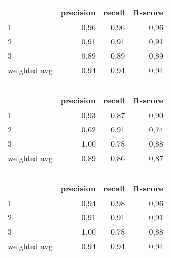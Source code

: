 \begin{table}
\centering
\caption{}%
\begin{tabular}{lrrr}
\toprule
{} &  precision &  recall &  f1-score \\
\midrule
1            &       0,96 &    0,96 &      0,96 \\
2            &       0,91 &    0,91 &      0,91 \\
3            &       0,89 &    0,89 &      0,89 \\
weighted avg &       0,94 &    0,94 &      0,94 \\
\bottomrule
\end{tabular}
\end{table}

\begin{table}
\centering
\caption{}%
\begin{tabular}{lrrr}
\toprule
{} &  precision &  recall &  f1-score \\
\midrule
1            &       0,93 &    0,87 &      0,90 \\
2            &       0,62 &    0,91 &      0,74 \\
3            &       1,00 &    0,78 &      0,88 \\
weighted avg &       0,89 &    0,86 &      0,87 \\
\bottomrule
\end{tabular}
\end{table}

\begin{table}
\centering
\caption{}%
\begin{tabular}{lrrr}
\toprule
{} &  precision &  recall &  f1-score \\
\midrule
1            &       0,94 &    0,98 &      0,96 \\
2            &       0,91 &    0,91 &      0,91 \\
3            &       1,00 &    0,78 &      0,88 \\
weighted avg &       0,94 &    0,94 &      0,94 \\
\bottomrule
\end{tabular}
\end{table}

